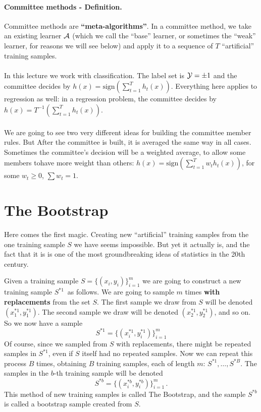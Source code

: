 \paragraph{Committee methods - Definition.} 
Committee methods are {\bf ``meta-algorithms''}. 
In a committee method, we take an existing learner $\mathcal{A}$ (which we call the
  ``base'' learner, or sometimes the ``weak'' learner, for reasons we will see
below) and apply it to a
sequence of $T$ ``artificial'' training samples.
\\~\\
In this lecture we work with classification. The label set is
$\mathcal{Y}={\pm 1}$ and the committee
decides by $h(x) = \text{sign} \left( \sum_{t=1}^T h_t(x) \right)$. 
Everything here applies to regression as well: in a regression problem, the
committee decides by $h(x) = T^{-1}\left( \sum_{t=1}^T h_t(x) \right)$.
\\~\\
We are going to see two very different ideas for building the committee member
rules. 
%
But After the committee is built, it is averaged the same way in all cases.
Sometimes the committee's decision will be a weighted average, to allow some
members tohave more weight than others:
$h(x) = \text{sign} \left( \sum_{t=1}^T w_t h_t(x) \right)$, 
for some  $w_t\geq 0$, $\sum w_t=1$.




\section{The Bootstrap}

Here comes the first magic. Creating new ``artificial'' training samples from
the one training sample $S$ we have seems impossible.
 But yet it actually is, and the fact that it is is one of
the most groundbreaking ideas of statistics in the 20th century. 

Given a training sample $S=\{(x_i,y_i)\}_{i=1}^m$ we are going to construct a
new training sample $S^{*1}$ as follows. We are going to sample $m$ times {\bf
with replacements} from the set $S$. The first sample we draw from $S$ will be denoted $(x^{*1}_1,y^{*1}_1)$. The second sample we draw will be denoted 
$(x^{*1}_2,y^{*1}_2)$, and so on. So we now have a sample
\[
  S^{*1}=\{(x^{*1}_i,y^{*1}_i)\}_{i=1}^m
\]
Of course, since we sampled from $S$ with replacements, there might be repeated
samples in $S^{*1}$, even if $S$ itself had no repeated samples. 
Now we can repeat this process $B$ times, obtaining $B$ training samples, each
of length $m$: $S^{*1},\ldots, S^{*B}$. The samples in the $b$-th training
sample will be denoted 
\[
  S^{*b}=\{(x^{*b}_i,y^{*b}_i)\}_{i=1}^m \,.
\]
%
\noindent This method of new training samples is called The Bootstrap, and the sample
$S^{*b}$ is called a bootstrap sample created from $S$. 

